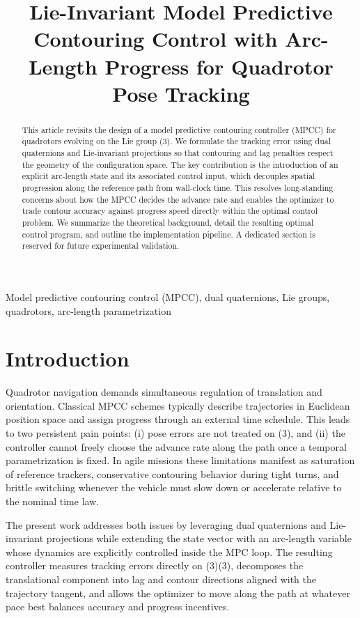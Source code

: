 \documentclass[letterpaper, 10pt, conference]{IEEEtran}
\title{Lie-Invariant Model Predictive Contouring Control with Arc-Length Progress for Quadrotor Pose Tracking}
\author{\IEEEauthorblockN{Author Name}
\IEEEauthorblockA{Department / Institution\\
Email: author@example.com}}
\newcommand{\SE}{\mathrm{SE}(3)}
\begin{document}
\maketitle
\thispagestyle{empty}
\pagestyle{empty}

\begin{abstract}
This article revisits the design of a model predictive contouring controller (MPCC) for quadrotors evolving on the Lie group \SE. We formulate the tracking error using dual quaternions and Lie-invariant projections so that contouring and lag penalties respect the geometry of the configuration space. The key contribution is the introduction of an explicit arc-length state and its associated control input, which decouples spatial progression along the reference path from wall-clock time. This resolves long-standing concerns about how the MPCC decides the advance rate and enables the optimizer to trade contour accuracy against progress speed directly within the optimal control problem. We summarize the theoretical background, detail the resulting optimal control program, and outline the implementation pipeline. A dedicated section is reserved for future experimental validation.
\end{abstract}

\begin{IEEEkeywords}
Model predictive contouring control (MPCC), dual quaternions, Lie groups, quadrotors, arc-length parametrization
\end{IEEEkeywords}

\section{Introduction}
Quadrotor navigation demands simultaneous regulation of translation and orientation. Classical MPCC schemes typically describe trajectories in Euclidean position space and assign progress through an external time schedule. This leads to two persistent pain points: (i) pose errors are not treated on \SE, and (ii) the controller cannot freely choose the advance rate along the path once a temporal parametrization is fixed. In agile missions these limitations manifest as saturation of reference trackers, conservative contouring behavior during tight turns, and brittle switching whenever the vehicle must slow down or accelerate relative to the nominal time law.

The present work addresses both issues by leveraging dual quaternions and Lie-invariant projections while extending the state vector with an arc-length variable whose dynamics are explicitly controlled inside the MPC loop. The resulting controller measures tracking errors directly on \SE(3), decomposes the translational component into lag and contour directions aligned with the trajectory tangent, and allows the optimizer to move along the path at whatever pace best balances accuracy and progress incentives.
\end{document}
